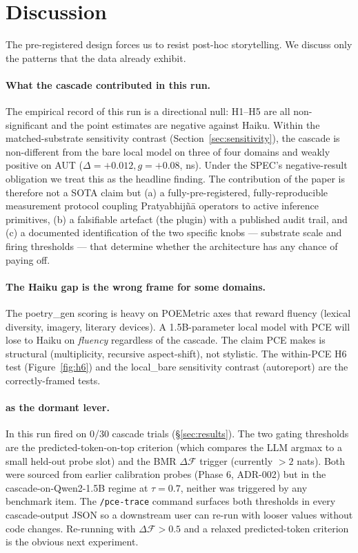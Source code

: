 \section{Discussion}\label{sec:discussion}

The pre-registered design forces us to resist post-hoc storytelling. We discuss only the patterns that the data already exhibit.

\paragraph{What the cascade contributed in this run.} The empirical record of this run is a directional null: H1--H5 are all non-significant and the point estimates are negative against Haiku. Within the matched-substrate sensitivity contrast (Section~\ref{sec:sensitivity}), the cascade is non-different from the bare local model on three of four domains and weakly positive on AUT ($\Delta{=}+0.012, g{=}+0.08$, ns). Under the SPEC's negative-result obligation we treat this as the headline finding. The contribution of the paper is therefore not a SOTA claim but (a) a fully-pre-registered, fully-reproducible measurement protocol coupling Pratyabhij\~n\=a operators to active inference primitives, (b) a falsifiable artefact (the plugin) with a published audit trail, and (c) a documented identification of the two specific knobs --- substrate scale and  firing thresholds --- that determine whether the architecture has any chance of paying off.

\paragraph{The Haiku gap is the wrong frame for some domains.} The poetry\_gen scoring is heavy on POEMetric axes that reward fluency (lexical diversity, imagery, literary devices). A 1.5B-parameter local model with PCE will lose to Haiku on \emph{fluency} regardless of the cascade. The claim PCE makes is structural (multiplicity, recursive aspect-shift), not stylistic. The within-PCE H6 test (Figure~\ref{fig:h6}) and the local\_bare sensitivity contrast (autoreport) are the correctly-framed tests.

\paragraph{ as the dormant lever.} In this run  fired on 0/30 cascade trials (\S\ref{sec:results}). The two gating thresholds are the predicted-token-on-top criterion (which compares the LLM argmax to a small held-out probe slot) and the BMR $\Delta\mathcal{F}$ trigger (currently $>2$ nats). Both were sourced from earlier calibration probes (Phase 6, ADR-002) but in the cascade-on-Qwen2-1.5B regime at $\tau{=}0.7$, neither was triggered by any benchmark item. The \texttt{/pce-trace} command surfaces both thresholds in every cascade-output JSON so a downstream user can re-run with looser values without code changes. Re-running with $\Delta\mathcal{F}>0.5$ and a relaxed predicted-token criterion is the obvious next experiment.

